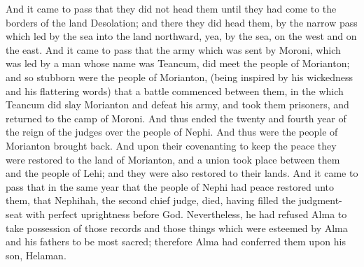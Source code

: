 And it came to pass that they did not head them until they had come to the borders of the land Desolation; and there they did head them, by the narrow pass which led by the sea into the land northward, yea, by the sea, on the west and on the east.
\bverse \iffalse And it came to pass that the army which was sent by Moroni, which was led by a man whose name was Teancum, did meet the people of Morianton; and so stubborn were the people of Morianton, (being inspired by his wickedness and his flattering words) that a battle commenced between them, in the which Teancum did slay Morianton and defeat his army, and took them prisoners, and returned to the camp of Moroni. And thus ended the twenty and fourth year of the reign of the judges over the people of Nephi. \fi
And it came to pass that the army which was sent by Moroni, which was led by a man whose name was Teancum, did meet the people of Morianton; and so stubborn were the people of Morianton, (being inspired by his wickedness and his flattering words) that a battle commenced between them, in the which Teancum did slay Morianton and defeat his army, and took them prisoners, and returned to the camp of Moroni. And thus ended the twenty and fourth year of the reign of the judges over the people of Nephi.
\bverse \iffalse And thus were the people of Morianton brought back. And upon their covenanting to keep the peace they were restored to the land of Morianton, and a union took place between them and the people of Lehi; and they were also restored to their lands. \fi
And thus were the people of Morianton brought back. And upon their covenanting to keep the peace they were restored to the land of Morianton, and a union took place between them and the people of Lehi; and they were also restored to their lands.
\bverse \iffalse And it came to pass that in the same year that the people of Nephi had peace restored unto them, that Nephihah, the second chief judge, died, having filled the judgment-seat with perfect uprightness before God. \fi
And it came to pass that in the same year that the people of Nephi had peace restored unto them, that Nephihah, the second chief judge, died, having filled the judgment-seat with perfect uprightness before God.
\bverse \iffalse Nevertheless, he had refused Alma to take possession of those records and those things which were esteemed by Alma and his fathers to be most sacred; therefore Alma had conferred them upon his son, Helaman. \fi
Nevertheless, he had refused Alma to take possession of those records and those things which were esteemed by Alma and his fathers to be most sacred; therefore Alma had conferred them upon his son, Helaman.
